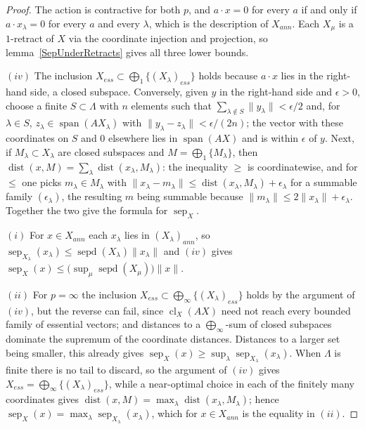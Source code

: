 \documentclass[11pt]{article}
\theoremstyle{plain}
\theoremstyle{definition}
\DeclareMathOperator{\dist}{dist}
\DeclareMathOperator{\sep}{sep}
\DeclareMathOperator{\sepd}{sepd}
\begin{document}
\begin{proof}
The action is contractive for both $p$, and $a\cdot x=0$ for every $a$ if and
only if $a\cdot x_\lambda=0$ for every $a$ and every $\lambda$, which is the
description of $X_{ann}$. Each $X_\mu$ is a $1$-retract of $X$ via the coordinate
injection and projection, so lemma~\ref{SepUnderRetracts} gives all three lower
bounds.

$(iv)$ The inclusion $X_{ess}\subset\bigoplus_1 \{{(X_\lambda)}_{ess} \}$ holds
because $a\cdot x$ lies in the right-hand side, a closed subspace. Conversely,
given $y$ in the right-hand side and $\epsilon>0$, choose a finite
$S\subset\Lambda$ with $n$ elements such that
$\sum_{\lambda\notin S}\lVert y_\lambda\rVert<\epsilon/2$ and, for $\lambda\in S$,
$z_\lambda\in\operatorname{span}(AX_\lambda)$ with
$\lVert y_\lambda-z_\lambda\rVert<\epsilon/(2n)$; the vector with these
coordinates on $S$ and $0$ elsewhere lies in $\operatorname{span}(AX)$ and is
within $\epsilon$ of $y$. Next, if $M_\lambda\subset X_\lambda$ are closed
subspaces and $M=\bigoplus_1 \{M_\lambda \}$, then
$\dist(x,M)=\sum_\lambda\dist(x_\lambda,M_\lambda)$: the inequality $\geq$ is
coordinatewise, and for $\leq$ one picks $m_\lambda\in M_\lambda$ with
$\lVert x_\lambda-m_\lambda\rVert\leq\dist(x_\lambda,M_\lambda)+\epsilon_\lambda$
for a summable family ${(\epsilon_\lambda)}$, the resulting $m$ being summable
because $\lVert m_\lambda\rVert\leq 2\lVert x_\lambda\rVert+\epsilon_\lambda$.
Together the two give the formula for $\sep_X$.

$(i)$ For $x\in X_{ann}$ each $x_\lambda$ lies in ${(X_\lambda)}_{ann}$, so
$\sep_{X_\lambda}(x_\lambda)\leq\sepd(X_\lambda)\lVert x_\lambda\rVert$ and
$(iv)$ gives
$\sep_X(x)\leq \bigl(\sup_\mu\sepd(X_\mu) \bigr)\lVert x\rVert$.

$(ii)$ For $p=\infty$ the inclusion
$X_{ess}\subset\bigoplus_\infty \{{(X_\lambda)}_{ess} \}$ holds by the argument
of $(iv)$, but the reverse can fail, since $\operatorname{cl}_X(AX)$ need not
reach every bounded family of essential vectors; and distances to a
$\bigoplus_\infty$-sum of closed subspaces dominate the supremum of the
coordinate distances. Distances to a larger set being smaller, this already gives
$\sep_X(x)\geq\sup_\lambda\sep_{X_\lambda}(x_\lambda)$. When $\Lambda$ is finite
there is no tail to discard, so the argument of $(iv)$ gives
$X_{ess}=\bigoplus_\infty \{{(X_\lambda)}_{ess} \}$, while a near-optimal choice
in each of the finitely many coordinates gives
$\dist(x,M)=\max_\lambda\dist(x_\lambda,M_\lambda)$; hence
$\sep_X(x)=\max_\lambda\sep_{X_\lambda}(x_\lambda)$, which for $x\in X_{ann}$ is
the equality in $(ii)$.


\end{proof}
\end{document}
